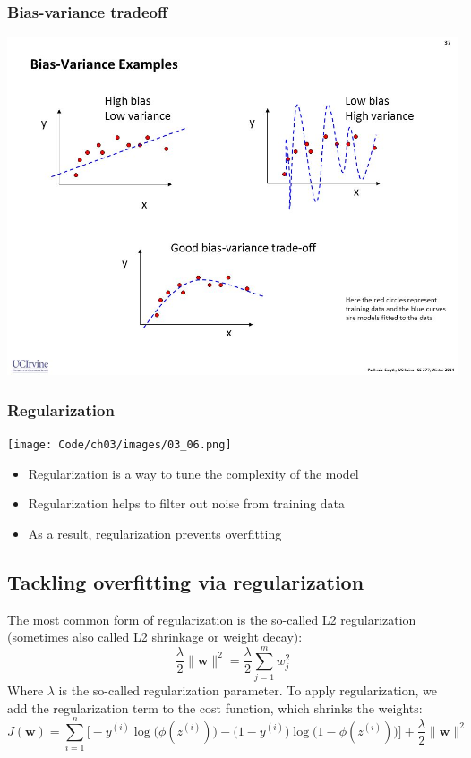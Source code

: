 \documentclass{beamer}
\begin{document}
\begin{frame}
  \frametitle{Bias-variance tradeoff}
  \includegraphics[scale=0.4]{Images/bias-variance.jpg}
\end{frame}

\begin{frame}
  \frametitle{Regularization}
  \texttt{[image: Code/ch03/images/03\_06.png]}
  \begin{itemize}
  \item Regularization is a way to tune the complexity of the model
  \item Regularization helps to filter out noise from training data
  \item As a result, regularization prevents overfitting
  \end{itemize}
\end{frame}

\begin{frame}
  \frametitle{}
  \subsection{Tackling overfitting via regularization}
  The most common form of regularization is the so-called L2 regularization (sometimes also called L2 shrinkage or weight decay):
  \[
  \frac{\lambda}{2} \lVert \mathbf{w} \rVert^2 = \frac{\lambda}{2} \sum_{j=1}^m w_{j}^{2}
  \]
  Where $\lambda$ is the so-called regularization parameter.
  To apply regularization, we add the regularization term to the cost function, which shrinks the weights:
  \[
  J(\mathbf{w}) = \sum_{i=1}^{n} \bigg[ - y^{(i)} \log \big(  \phi(z^{(i)})  \big)  - \big( 1 - y ^{(i)} \big)  \log \big( 1 - \phi(z^{(i)})   \big)   \bigg] + \frac{\lambda}{2} \lVert \mathbf{w}\rVert^2  
  \]
\end{frame}
\end{document}
